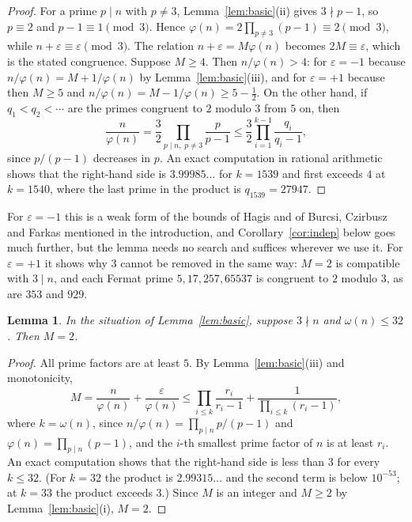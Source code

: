 \documentclass[screen,reqno]{aomart}
\numberwithin{equation}{section}
\theoremstyle{plain}
\newtheorem{lemma}[theorem]{Lemma}
\theoremstyle{definition}
\theoremstyle{remark}
\begin{document}
\begin{proof}
For a prime $p\mid n$ with $p\ne3$, Lemma~\ref{lem:basic}(ii) gives
$3\nmid p-1$, so $p\equiv2$ and $p-1\equiv1\pmod 3$. Hence
$\varphi(n)=2\prod_{p\ne3}(p-1)\equiv2\pmod3$, while
$n+\varepsilon\equiv\varepsilon\pmod 3$. The relation
$n+\varepsilon=M\varphi(n)$ becomes $2M\equiv\varepsilon$, which is
the stated congruence. Suppose $M\ge4$. Then $n/\varphi(n)>4$: for
$\varepsilon=-1$ because $n/\varphi(n)=M+1/\varphi(n)$ by
Lemma~\ref{lem:basic}(iii), and for $\varepsilon=+1$ because then
$M\ge5$ and $n/\varphi(n)=M-1/\varphi(n)\ge5-\tfrac12$. On the other hand, if $q_1<q_2<\cdots$ are the
primes congruent to $2$ modulo $3$ from $5$ on, then
\[
  \frac{n}{\varphi(n)}=\frac32\prod_{p\mid n,\;p\ne3}\frac{p}{p-1}
  \le\frac32\prod_{i=1}^{k-1}\frac{q_i}{q_i-1},
\]
since $p/(p-1)$ decreases in $p$. An exact computation in rational
arithmetic shows that the right-hand side is $3.99985\ldots$ for
$k=1539$ and first exceeds $4$ at $k=1540$, where the last prime in the
product is $q_{1539}=27947$.
\end{proof}

For $\varepsilon=-1$ this is a weak form of the bounds of Hagis and of
Burcsi, Czirbusz and Farkas mentioned in the introduction, and
Corollary~\ref{cor:indep} below goes much further, but the lemma needs
no search and suffices wherever we use it. For $\varepsilon=+1$ it
shows why $3$ cannot be
removed in the same way: $M=2$ is compatible with $3\mid n$, and each
Fermat prime $5,17,257,65537$ is congruent to $2$ modulo $3$, as are
$353$ and $929$.

\begin{lemma}\label{lem:Mtwo}
In the situation of Lemma~\ref{lem:basic}, suppose $3\nmid n$ and
$\omega(n)\le32$. Then $M=2$.
\end{lemma}

\begin{proof}
All prime factors are at least $5$. By Lemma~\ref{lem:basic}(iii)
and monotonicity,
\[
  M=\frac{n}{\varphi(n)}+\frac{\varepsilon}{\varphi(n)}
  \le\prod_{i\le k}\frac{r_i}{r_i-1}+\frac{1}{\prod_{i\le k}(r_i-1)} ,
\]
where $k=\omega(n)$, since $n/\varphi(n)=\prod_{p\mid n}p/(p-1)$ and
$\varphi(n)=\prod_{p\mid n}(p-1)$, and the $i$-th smallest prime factor
of $n$ is at least $r_i$. An exact computation shows that the
right-hand side is less than $3$ for every $k\le32$. (For $k=32$ the
product is $2.99315\ldots$ and the second term is below $10^{-53}$; at
$k=33$ the product exceeds $3$.) Since $M$ is an integer and $M\ge2$
by Lemma~\ref{lem:basic}(i), $M=2$.
\end{proof}
\end{document}
